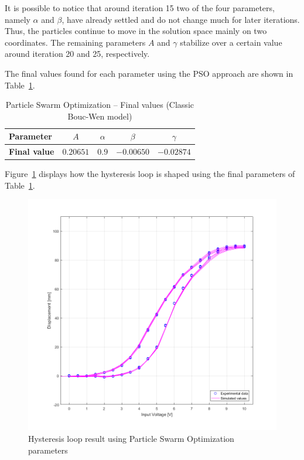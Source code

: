 It is possible to notice that around iteration 15 two of the four parameters,
namely $\alpha$ and $\beta$, have already settled and do not change much for
later iterations. Thus, the particles continue to move in the solution space
mainly on two coordinates. The remaining parameters $A$ and $\gamma$ stabilize
over a certain value around iteration 20 and 25, respectively.

The final values found for each parameter using the PSO approach
are shown in Table~\ref{tab:pso_classic_final}.

\begin{table}[H]
	\centering
	\begin{tabular}{l c c c c}
		\toprule
		\textbf{Parameter}		& $A$	& $\alpha$	& $\beta$	& $\gamma$ 	\\ \midrule
		\textbf{Final value}	& $0.20651$	& $0.9$	& $-0.00650$ & $-0.02874$ \\
		\bottomrule
	\end{tabular}
	\caption{Particle Swarm Optimization -- Final values (Classic Bouc-Wen model)}
	\label{tab:pso_classic_final}
\end{table}

Figure~\ref{fig:pso_classic_hys} displays how the hysteresis loop is shaped
using the final parameters of Table~\ref{tab:pso_classic_final}.

\begin{figure}[H]
	\centering
	\includegraphics[width=\linewidth]{Images/pso_classic_final}
	\caption{Hysteresis loop result using Particle Swarm Optimization parameters}
	\label{fig:pso_classic_hys}
\end{figure}

